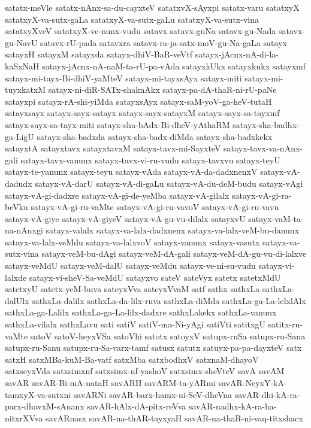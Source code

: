 {satatx-meVle
satatx-nAnx-sa-du-cayxteV
satatxvX-sAyxpi
satatx-varu
satatxyX
satatxyX-va-sutx-gaLa
satatxyX-va-sutx-gaLu
satatxyX-va-sutx-vina
satatxyXveV
satatxyX-ve-nunx-vudu
satavx
satavx-guNa
satavx-gu-Nada
satavx-gu-NavU
satavx-rU-pada
satavxra
satavx-ra-ja-satx-moV-gu-Na-gaLa
satayx
satayxH
satayxM
satayxda
satayx-dhiV-BaR-veVtf
satayx-jAcnx-nA-di-la-kaSxNaH
satayx-jAcnx-nA-naM-ta-rU-pa-vAda
satayxkUkx
satayxkukx
satayxmf
satayx-mi-tayx-Bi-dhiV-yaMteV
satayx-mi-tayxsAyx
satayx-miti
satayx-mi-tuyxkatxM
satayx-ni-diR-SATx-shaknAkx
satayx-pa-dA-thaR-ni-rU-paNe
satayxpi
satayx-rA-shi-yiMda
satayxsAyx
satayx-saM-yoV-ga-heV-tutaH
satayxsayx
satayx-sayx-satayx
satayx-sayx-satayxM
satayx-sayx-sa-tayxmf
satayx-sayx-sa-tayx-miti
satayx-sha-bAdx-Bi-dheV-yAthaRM
satayx-sha-badhx-ga-LigU
satayx-sha-badxda
satayx-sha-badx-diMda
satayx-sha-badxkekx
satayxtA
satayxtavx
satayxtavxM
satayx-tavx-mi-SayxteV
satayx-tavx-va-nAnx-gali
satayx-tavx-vanunx
satayx-tavx-vi-ru-vudu
satayx-tavxvu
satayx-teyU
satayx-te-yanunx
satayx-teyu
satayx-vAda
satayx-vA-da-dadxnenxV
satayx-vA-dadudx
satayx-vA-darU
satayx-vA-di-gaLu
satayx-vA-du-deM-budu
satayx-vAgi
satayx-vA-gi-dadxre
satayx-vA-gi-de-yeMba
satayx-vA-gilalx
satayx-vA-gi-ra-beVku
satayx-vA-gi-ru-vaMte
satayx-vA-gi-ru-vavoV
satayx-vA-gi-ru-vavu
satayx-vA-giye
satayx-vA-giyeV
satayx-vA-gu-vu-dilalx
satayxvU
satayx-vaM-ta-na-nAnxgi
satayx-valalx
satayx-va-lalx-dadxnenx
satayx-va-lalx-veM-bu-danunx
satayx-va-lalx-veMdu
satayx-va-lalxvoV
satayx-vanunx
satayx-vasutx
satayx-va-sutx-vina
satayx-veM-bu-dAgi
satayx-veM-dA-gali
satayx-veM-dA-gu-vu-di-lalxve
satayx-veMdU
satayx-veM-dalU
satayx-veMdu
satayx-ve-ni-su-vudu
satayx-vi-lalxde
satayx-vi-sheV-Sa-veMdU
satayxvo
sateV
sateVyx
satetx
satetxMdU
satetxyU
satetx-yeM-buva
sateyxVva
sateyxVvaM
satf
sathx
sathxLa
sathxLa-dalUlx
sathxLa-dalilx
sathxLa-da-lilx-ruva
sathxLa-diMda
sathxLa-ga-La-lelxlAlx
sathxLa-ga-Lalilx
sathxLa-ga-La-lilx-dadxre
sathxLakekx
sathxLa-vanunx
sathxLa-vilalx
sathxLavu
sati
satiV
satiV-ma-Ni-yAgi
satiVti
satitxgU
satitx-ru-vaMte
satoV
satoV-heyxVSa
satoVhi
satotx
satoyxV
satupx-ruSa
satupx-ru-Sana
satupx-ru-Sanu
satupx-ru-Sa-varx-tamf
satusx
satutx
satuyx-pa-pa-dayxteV
satx
satxH
satxMBa-kuM-Ba-vatf
satxMba
satxbodhxV
satxnaM-dhayoV
satxseyxVda
satxsimxnf
satxsimx-nf-yashoV
satxsimx-sheVteV
savA
savAM
savAR
savAR-Bi-mA-nataH
savARH
savARM-ta-yARmi
savAR-NeyxY-kA-tamxyX-va-sutxni
savARNi
savAR-barx-hamx-ni-SeV-dheVna
savAR-dhi-kA-ra-parx-dhavxM-sAnanx
savAR-hAlx-dA-pitx-reVva
savAR-nadhx-kA-ra-ha-nitxrXVva
savARnasx
savAR-na-thAR-tayxyaH
savAR-na-thaR-ni-vaq-titxshacx
}

